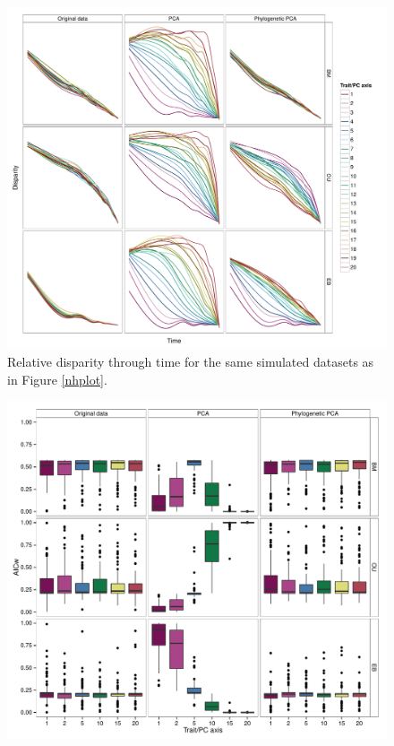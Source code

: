 \documentclass[a4paper,12pt]{article}
\begin{document}
\begin{figure}[p]
\centering
\includegraphics[scale=0.5]{./fig/dtt-3models.pdf}
\caption{Relative disparity through time for the same simulated datasets as in Figure \ref{nhplot}.}
\label{dttplot}
\end{figure}

\begin{figure}[p]
\centering
\includegraphics[scale=0.5]{./fig/box-aicw-mvbm.pdf}
\caption{}
\label{aicwbm}
\end{figure}
\end{document}
